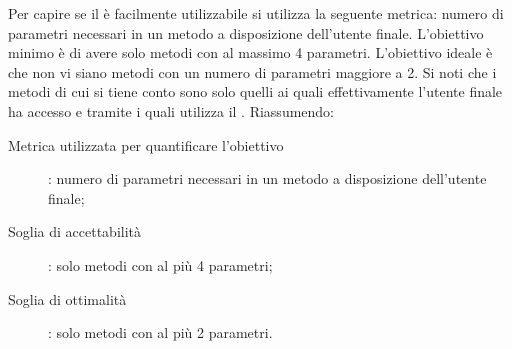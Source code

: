 					Per capire se il  è facilmente utilizzabile si utilizza la seguente metrica: numero di parametri necessari in un metodo a disposizione dell'utente finale. L'obiettivo minimo è di avere solo metodi con al massimo 4 parametri. L'obiettivo ideale è che non vi siano metodi con un numero di parametri maggiore a 2. Si noti che i metodi di cui si tiene conto sono solo quelli ai quali effettivamente l'utente finale ha accesso e tramite i quali utilizza il . Riassumendo:
					\begin{description}
						\item[Metrica utilizzata per quantificare l'obiettivo]: numero di parametri necessari in un metodo a disposizione dell'utente finale;
						\item[Soglia di accettabilità]: solo metodi con al più 4 parametri;
						\item[Soglia di ottimalità]: solo metodi con al più 2 parametri.
					\end{description}
					